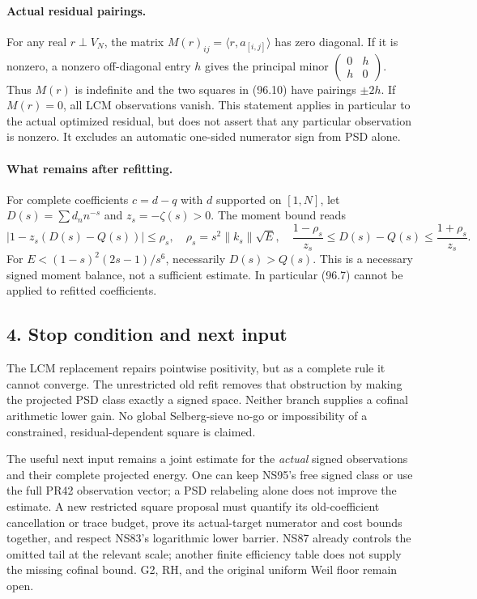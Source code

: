 \paragraph{Actual residual pairings.}
For any real $r\perp V_N$, the matrix
$M(r)_{ij}=\langle r,a_{[i,j]}\rangle$ has zero diagonal.
If it is nonzero, a nonzero off-diagonal entry $h$ gives the principal
minor $\left(\begin{smallmatrix}0&h\\h&0\end{smallmatrix}\right)$.
Thus $M(r)$ is indefinite and the two squares in (96.10) have pairings
$\pm2h$. If $M(r)=0$, all LCM observations vanish.
This statement applies in particular to the actual optimized residual,
but does not assert that any particular observation is nonzero.
It excludes an automatic one-sided numerator sign from PSD alone.

\paragraph{What remains after refitting.}
For complete coefficients $c=d-q$ with $d$ supported on $[1,N]$, let
$D(s)=\sum d_n n^{-s}$ and $z_s=-\zeta(s)>0$. The moment bound reads
\[
 |1-z_s(D(s)-Q(s))|\leq\rho_s,
 \quad \rho_s=s^2\|k_s\|\sqrt E,
 \quad \frac{1-\rho_s}{z_s}\leq D(s)-Q(s)
                           \leq\frac{1+\rho_s}{z_s}.
 \tag{96.11}
\]
For $E<(1-s)^2(2s-1)/s^6$, necessarily $D(s)>Q(s)$.
This is a necessary signed moment balance, not a sufficient estimate.
In particular (96.7) cannot be applied to refitted coefficients.

\subsection*{4. Stop condition and next input}
The LCM replacement repairs pointwise positivity, but as a complete rule
it cannot converge. The unrestricted old refit removes that obstruction
by making the projected PSD class exactly a signed space. Neither branch
supplies a cofinal arithmetic lower gain. No global Selberg-sieve no-go
or impossibility of a constrained, residual-dependent square is claimed.

The useful next input remains a joint estimate for the \emph{actual}
signed observations and their complete projected energy. One can keep
NS95's free signed class or use the full PR42 observation vector; a PSD
relabeling alone does not improve the estimate. A new restricted square
proposal must quantify its old-coefficient cancellation or trace budget,
prove its actual-target numerator and cost bounds together, and respect
NS83's logarithmic lower barrier. NS87 already controls the omitted tail
at the relevant scale; another finite efficiency table does not supply
the missing cofinal bound. G2, RH, and the original uniform Weil floor
remain open.
